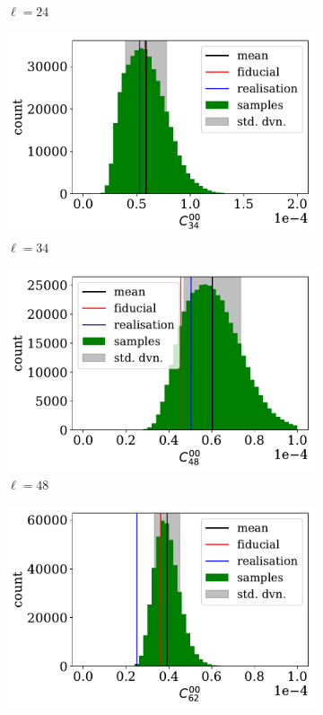 \begin{figure}
\begin{subfigure}{.5\textwidth}
  \caption{$\ell = 24$}
\end{subfigure}
\begin{subfigure}{.5\textwidth}
  \centering
  \includegraphics[width=\textwidth]{BPL-FIGS/Euclid-LN-PNoi-N32-HDens_HISTOGRAM-ell-34.pdf}
  \caption{$\ell = 34$}
\end{subfigure}
\begin{subfigure}{.5\textwidth}
  \centering
  \includegraphics[width=\textwidth]{BPL-FIGS/Euclid-LN-PNoi-N32-HDens_HISTOGRAM-ell-48.pdf}
  \caption{$\ell = 48$}
\end{subfigure}
\begin{subfigure}{.5\textwidth}
  \centering
  \includegraphics[width=\textwidth]{BPL-FIGS/Euclid-LN-PNoi-N32-HDens_HISTOGRAM-ell-62.pdf}

\end{subfigure}
\end{figure}
